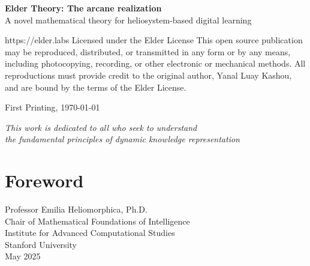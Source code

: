 \documentclass[11pt,twoside]{book}
\begin{document}
\thispagestyle{empty}
\vspace*{3cm}
\begin{center}
    {\Large\bfseries Elder Theory: The arcane realization}\\[2mm]
    {\large A novel mathematical theory for heliosystem-based digital learning}
\end{center}
https://elder.labs
\vspace{2cm}
\noindent
Licensed under the Elder License
\vspace{0.5cm}
\noindent
This open source publication may be reproduced, distributed, or transmitted in any form or by any means, including photocopying, recording, or other electronic or mechanical methods. All reproductions must provide credit to the original author, Yanal Luay Kashou, and are bound by the terms of the Elder License.
\vspace{0.5cm}


\noindent 
First Printing, \today

\vspace{4cm}
\begin{center}
    \textit{This work is dedicated to all who seek to understand\\
    the fundamental principles of dynamic knowledge representation}
\end{center}

\newpage

\tableofcontents

\newpage
\listoffigures

\newpage
\listoftables

\chapter*{Foreword}


\vspace{1cm}
\begin{flushright}
Professor Emilia Heliomorphica, Ph.D.\\
Chair of Mathematical Foundations of Intelligence\\
Institute for Advanced Computational Studies\\
Stanford University\\
May 2025
\end{flushright}
\end{document}
